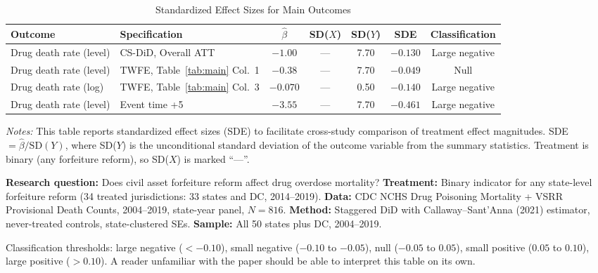 \documentclass[12pt]{article}
\begin{document}
\begin{table}[H]
\centering
\caption{Standardized Effect Sizes for Main Outcomes}
\label{tab:sde}
\begin{adjustbox}{max width=\textwidth}
\begin{tabular}{llccccc}
\toprule
Outcome & Specification & $\hat{\beta}$ & SD($X$) & SD($Y$) & SDE & Classification \\
\midrule
Drug death rate (level) & CS-DiD, Overall ATT & $-1.00$ & --- & 7.70 & $-0.130$ & Large negative \\
Drug death rate (level) & TWFE, Table~\ref{tab:main} Col.\ 1 & $-0.38$ & --- & 7.70 & $-0.049$ & Null \\
Drug death rate (log) & TWFE, Table~\ref{tab:main} Col.\ 3 & $-0.070$ & --- & 0.50 & $-0.140$ & Large negative \\
Drug death rate (level) & Event time +5 & $-3.55$ & --- & 7.70 & $-0.461$ & Large negative \\
\bottomrule
\end{tabular}
\end{adjustbox}
\par\vspace{0.3em}
{\footnotesize \textit{Notes:} This table reports standardized effect sizes (SDE) to facilitate cross-study comparison of treatment effect magnitudes. SDE $= \hat{\beta} / \text{SD}(Y)$, where SD($Y$) is the unconditional standard deviation of the outcome variable from the summary statistics. Treatment is binary (any forfeiture reform), so SD($X$) is marked ``---''.

\textbf{Research question:} Does civil asset forfeiture reform affect drug overdose mortality?
\textbf{Treatment:} Binary indicator for any state-level forfeiture reform (34 treated jurisdictions: 33 states and DC, 2014--2019).
\textbf{Data:} CDC NCHS Drug Poisoning Mortality + VSRR Provisional Death Counts, 2004--2019, state-year panel, $N = 816$.
\textbf{Method:} Staggered DiD with Callaway--Sant'Anna (2021) estimator, never-treated controls, state-clustered SEs.
\textbf{Sample:} All 50 states plus DC, 2004--2019.

Classification thresholds: large negative ($< -0.10$), small negative ($-0.10$ to $-0.05$), null ($-0.05$ to $0.05$), small positive ($0.05$ to $0.10$), large positive ($> 0.10$). A reader unfamiliar with the paper should be able to interpret this table on its own.}
\end{table}
\end{document}
